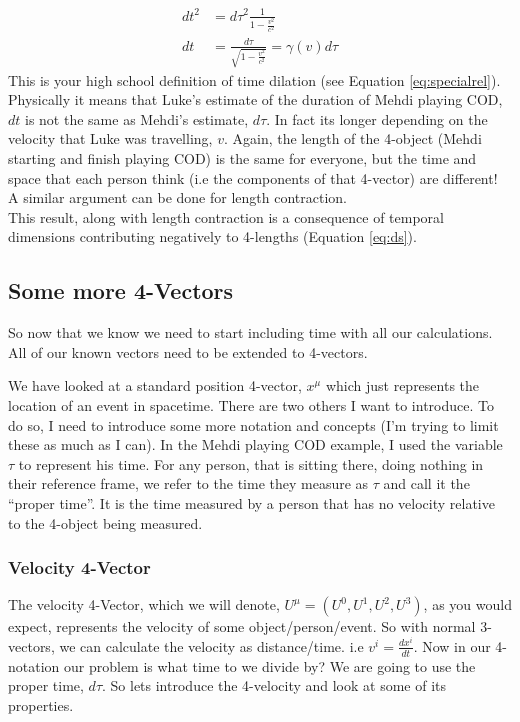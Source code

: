 \begin{equation}
  \begin{aligned}
  dt^2 &= d\tau^2 \frac{1}{1  - \frac{v^2}{c^2}} \\
  dt &= \frac{d \tau}{\sqrt{1 - \frac{v^2}{c^2}}} = \gamma(v) d\tau
\end{aligned}
\end{equation}
This is your high school definition of time dilation (see Equation \eqref{eq:specialrel}). Physically it means that Luke's estimate of the duration of Mehdi playing COD, $dt$ is not the same as Mehdi's estimate, $d\tau$. In fact its longer depending on the velocity that Luke was travelling, $v$. Again, the length of the 4-object (Mehdi starting and finish playing COD) is the same for everyone, but the time and space that each person think (i.e the components of that 4-vector) are different! \\
A similar argument can be done for length contraction. \\

This result, along with length contraction is a consequence of temporal dimensions contributing negatively to 4-lengths (Equation \eqref{eq:ds}).


\subsection{Some more 4-Vectors}
So now that we know we need to start including time with all our calculations. All of our known vectors need to be extended to 4-vectors. 

We have looked at a standard position 4-vector, $x^\mu$ which just represents the location of an event in spacetime. There are two others I want to introduce. To do so, I need to introduce some more notation and concepts (I'm trying to limit these as much as I can). In the Mehdi playing COD example, I used the variable $\tau$ to represent his time. For any person, that is sitting there, doing nothing in their reference frame, we refer to the time they measure as $\tau$ and call it the ``proper time''. It is the time measured by a person that has no velocity relative to the 4-object being measured.  

\subsubsection{Velocity 4-Vector}
The velocity 4-Vector, which we will denote, $U^\mu = (U^0, U^1, U^2, U^3)$, as you would expect, represents the velocity of some object/person/event. So with normal 3-vectors, we can calculate the velocity as distance/time. i.e $v^i = \frac{dx^i}{dt}$. Now in our 4-notation our problem is what time to we divide by? We are going to use the proper time, $d\tau$. So lets introduce the 4-velocity and look at some of its properties. 


